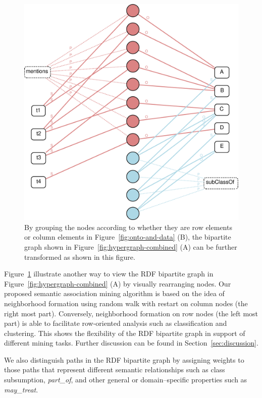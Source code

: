 \begin{figure}[tbh]
\begin{center}
\includegraphics[width=.45\textwidth]{fig/hypergraph_mining-bipartite-weighted.eps}
\end{center}
\caption{\label{fig:bipartitegraph-weighted} By grouping the nodes according to whether they are row elements or column elements in Figure~\ref{fig:onto-and-data} (B), the bipartite graph shown in Figure~\ref{fig:hypergraph-combined} (A) can be further transformed as shown in this figure.}
\end{figure}

Figure~\ref{fig:bipartitegraph-weighted} illustrate another way to view the RDF bipartite graph in Figure~\ref{fig:hypergraph-combined} (A) by visually rearranging nodes. Our proposed semantic association mining algorithm is based on the idea of neighborhood formation using random walk with restart on column nodes (the right most part). Conversely, neighborhood formation on row nodes (the left most part) is able to facilitate row-oriented analysis such as classification and clustering. This shows the flexibility of the RDF bipartite graph in support of different mining tasks. Further discussion can be found in Section~\ref{sec:discussion}.

We also distinguish paths in the RDF bipartite graph by assigning weights to those paths that represent different semantic relationships such as class subsumption, \emph{part\_of}, and other general or domain--specific properties such as \emph{may\_treat}.

